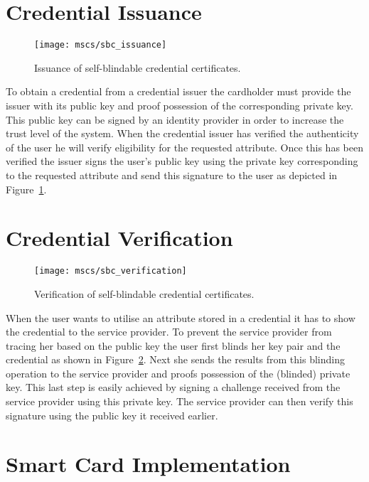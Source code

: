 
\section{Credential Issuance}

\begin{figure}[ht]
  \centering
  \texttt{[image: mscs/sbc\_issuance]}
  \caption{Issuance of self-blindable credential certificates.}
  \label{fig:SBC-issuance}
\end{figure}

To obtain a credential from a credential issuer the cardholder must provide the
issuer with its public key and proof possession of the corresponding private key.
This public key can be signed by an identity provider in order to increase the
trust level of the system. When the credential issuer has verified the
authenticity of the user he will verify eligibility for the requested attribute.
Once this has been verified the issuer signs the user's public key using the
private key corresponding to the requested attribute and send this signature to
the user as depicted in Figure~\ref{fig:SBC-issuance}.

\section{Credential Verification}

\begin{figure}[ht]
  \centering
  \texttt{[image: mscs/sbc\_verification]}
  \caption{Verification of self-blindable credential certificates.}
  \label{fig:SBC-verification}
\end{figure}

When the user wants to utilise an attribute stored in a credential it has to
show the credential to the service provider. To prevent the service provider
from tracing her based on the public key the user first blinds her key pair and
the credential as shown in Figure~\ref{fig:SBC-verification}. Next she sends
the results from this blinding operation to the service provider and proofs
possession of the (blinded) private key. This last step is easily achieved by
signing a challenge received from the service provider using this private key.
The service provider can then verify this signature using the public key it
received earlier.

\section{Smart Card Implementation}

